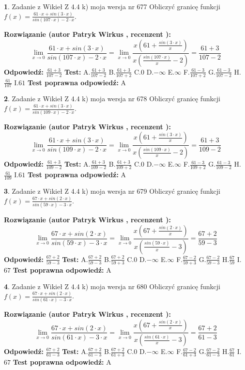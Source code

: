 \documentclass[12pt, a4paper]{article}
\theoremstyle{definition} %
\newtheorem{zad}{}
\newcommand{\zadStart}[1]{\begin{zad}#1\newline}
\newcommand{\zadStop}{\end{zad}}
\newcommand{\rozwStart}[2]{\noindent \textbf{Rozwiązanie (autor #1 , recenzent #2): }\newline}
\newcommand{\rozwStop}{\newline}
\newcommand{\odpStart}{\noindent \textbf{Odpowiedź:}\newline}
\newcommand{\odpStop}{\newline}
\newcommand{\testStart}{\noindent \textbf{Test:}\newline}
\newcommand{\testStop}{\newline}
\newcommand{\kluczStart}{\noindent \textbf{Test poprawna odpowiedź:}\newline}
\newcommand{\kluczStop}{\newline}
\begin{document}
\zadStart{Zadanie z Wikieł Z 4.4 k) moja wersja nr 677}
Obliczyć granicę funkcji $f(x)=\frac{61\cdot x +sin(3\cdot x)}{sin(107\cdot x) -2\cdot x}$.
\zadStop
\rozwStart{Patryk Wirkus}{}
$$\lim\limits_{x\to 0}\frac{61\cdot x +sin(3\cdot x)}{sin(107\cdot x) -2\cdot x}
=\lim\limits_{x\to 0}\frac{x(61+\frac{sin(3\cdot x)}{x})}{x(\frac{sin(107\cdot x)}{x}-2)}
=\frac{61+3}{107-2}$$
\rozwStop
\odpStart
$\frac{61+3}{107-2}$
\odpStop
\testStart
A.$\frac{61+3}{107-2}$
B.$\frac{61+3}{107+2}$
C.$0$
D.$-\infty$
E.$\infty$
F.$\frac{61-3}{107+2}$
G.$\frac{61-3}{107-2}$
H.$\frac{61}{107}$
I.$61$
\testStop
\kluczStart
A
\kluczStop



\zadStart{Zadanie z Wikieł Z 4.4 k) moja wersja nr 678}
Obliczyć granicę funkcji $f(x)=\frac{61\cdot x +sin(3\cdot x)}{sin(109\cdot x) -2\cdot x}$.
\zadStop
\rozwStart{Patryk Wirkus}{}
$$\lim\limits_{x\to 0}\frac{61\cdot x +sin(3\cdot x)}{sin(109\cdot x) -2\cdot x}
=\lim\limits_{x\to 0}\frac{x(61+\frac{sin(3\cdot x)}{x})}{x(\frac{sin(109\cdot x)}{x}-2)}
=\frac{61+3}{109-2}$$
\rozwStop
\odpStart
$\frac{61+3}{109-2}$
\odpStop
\testStart
A.$\frac{61+3}{109-2}$
B.$\frac{61+3}{109+2}$
C.$0$
D.$-\infty$
E.$\infty$
F.$\frac{61-3}{109+2}$
G.$\frac{61-3}{109-2}$
H.$\frac{61}{109}$
I.$61$
\testStop
\kluczStart
A
\kluczStop



\zadStart{Zadanie z Wikieł Z 4.4 k) moja wersja nr 679}
Obliczyć granicę funkcji $f(x)=\frac{67\cdot x +sin(2\cdot x)}{sin(59\cdot x) -3\cdot x}$.
\zadStop
\rozwStart{Patryk Wirkus}{}
$$\lim\limits_{x\to 0}\frac{67\cdot x +sin(2\cdot x)}{sin(59\cdot x) -3\cdot x}
=\lim\limits_{x\to 0}\frac{x(67+\frac{sin(2\cdot x)}{x})}{x(\frac{sin(59\cdot x)}{x}-3)}
=\frac{67+2}{59-3}$$
\rozwStop
\odpStart
$\frac{67+2}{59-3}$
\odpStop
\testStart
A.$\frac{67+2}{59-3}$
B.$\frac{67+2}{59+3}$
C.$0$
D.$-\infty$
E.$\infty$
F.$\frac{67-2}{59+3}$
G.$\frac{67-2}{59-3}$
H.$\frac{67}{59}$
I.$67$
\testStop
\kluczStart
A
\kluczStop



\zadStart{Zadanie z Wikieł Z 4.4 k) moja wersja nr 680}
Obliczyć granicę funkcji $f(x)=\frac{67\cdot x +sin(2\cdot x)}{sin(61\cdot x) -3\cdot x}$.
\zadStop
\rozwStart{Patryk Wirkus}{}
$$\lim\limits_{x\to 0}\frac{67\cdot x +sin(2\cdot x)}{sin(61\cdot x) -3\cdot x}
=\lim\limits_{x\to 0}\frac{x(67+\frac{sin(2\cdot x)}{x})}{x(\frac{sin(61\cdot x)}{x}-3)}
=\frac{67+2}{61-3}$$
\rozwStop
\odpStart
$\frac{67+2}{61-3}$
\odpStop
\testStart
A.$\frac{67+2}{61-3}$
B.$\frac{67+2}{61+3}$
C.$0$
D.$-\infty$
E.$\infty$
F.$\frac{67-2}{61+3}$
G.$\frac{67-2}{61-3}$
H.$\frac{67}{61}$
I.$67$
\testStop
\kluczStart
A
\kluczStop
\end{document}
